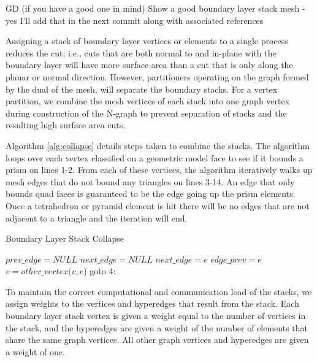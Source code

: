\documentclass[conference]{IEEEtran}
\begin{document}
{\color{red} GD (if you have a good one in mind) Show a good boundary layer
stack mesh - yes I'll add that in the next commit along with associated
references}

Assigning a stack of boundary layer vertices or
elements to a single process reduces the cut; i.e., cuts that are both normal to
and in-plane with the boundary layer will have more surface area than a cut that
is only along the planar or normal direction.
However, partitioners
operating on the graph formed by the dual of the mesh, will separate
the boundary stacks. For a vertex partition, we combine the mesh vertices of each stack into one graph vertex
during construction of the N-graph to prevent separation of stacks and the
resulting high surface area cuts. 

Algorithm \ref{alg:collapse} details steps taken to
combine the stacks. The algorithm loops over each vertex classified on a geometric
model face to see if it bounds a prism on lines 1-2. From each of these vertices, the
algorithm iteratively walks up mesh edges that do not bound any triangles on lines 3-14. An edge
that only bounds quad faces is guaranteed to be the edge going up the prism elements. Once
a tetrahedron or pyramid element is hit there will be no edges that are not adjacent to a triangle
and the iteration will end.
\begin{algorithm}
  \caption{Boundary Layer Stack Collapse}
  \label{alg:collapse}
  \small
  \begin{algorithmic}[1]
    \State $prev\_edge = NULL$
    \State $next\_edge = NULL$
    \State $next\_edge = e$
    \EndIf
    \EndFor
    \State $edge\_prev = e$
    \State $v = other\_vertex(v,e$)
    \State goto 4:
    \EndIf
    \EndIf
    \EndFor
  \end{algorithmic}
\end{algorithm}

To maintain the correct computational and communication load of the stacks,
we assign weights to the vertices and hyperedges that result from the stack. Each boundary layer
stack vertex is given a weight equal to the number of vertices in the stack, and the hyperedges
are given a weight of the number of elements that share the same graph vertices. All other
graph vertices and hyperedges are given a weight of one.
\end{document}
